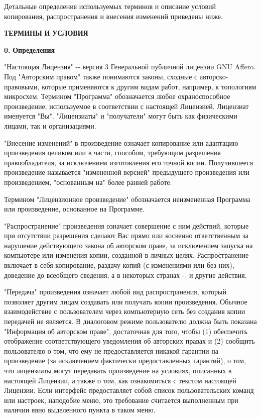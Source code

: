 Детальные определения используемых терминов и описание условий копирования, распространения и внесения изменений приведены ниже.

{\bfseries{ТЕРМИНЫ}} {\bfseries{И}} {\bfseries{УСЛОВИЯ}}

{\bfseries{0.}} {\bfseries{Определения}}

"{}Настоящая Лицензия"{} -\/-\/ версия 3 Генеральной публичной лицензии GNU Affero. Под "{}Авторским правом"{} также понимаются законы, сходные с авторско-\/правовыми, которые применяются к другим видам работ, например, к топологиям микросхем. Термином "{}Программа"{} обозначается любое охраноспособное произведение, используемое в соответствии с настоящей Лицензией. Лицензиат именуется "{}Вы"{}. "{}Лицензиаты"{} и "{}получатели"{} могут быть как физическими лицами, так и организациями.

"{}Внесение изменений"{} в произведение означает копирование или адаптацию произведения целиком или в части, способом, требующим разрешения правообладателя, за исключением изготовления его точной копии. Получившееся произведение называется "{}измененной версией"{} предыдущего произведения или произведением, "{}основанным на"{} более ранней работе.

Термином "{}Лицензионное произведение"{} обозначается неизмененная Программа или произведение, основанное на Программе.

"{}Распространение"{} произведения означает совершение с ним действий, которые при отсутствии разрешения сделают Вас прямо или косвенно ответственным за нарушение действующего закона об авторском праве, за исключением запуска на компьютере или изменения копии, созданной в личных целях. Распространение включает в себя копирование, раздачу копий (с изменениями или без них), доведение до всеобщего сведения, а в некоторых странах -\/-\/ и другие действия.

"{}Передача"{} произведения означает любой вид распространения, который позволяет другим лицам создавать или получать копии произведения. Обычное взаимодействие с пользователем через компьютерную сеть без создания копии передачей не является. В диалоговом режиме пользователю должна быть показана "{}Информация об авторском праве"{}, достаточная для того, чтобы (1) обеспечить отображение соответствующего уведомления об авторских правах и (2) сообщить пользователю о том, что ему не предоставляется никакой гарантии на произведение (за исключением фактически предоставленных гарантий), о том, что лицензиаты могут передавать произведение на условиях, описанных в настоящей Лицензии, а также о том, как ознакомиться с текстом настоящей Лицензии. Если интерфейс предоставляет собой список пользовательских команд или настроек, наподобие меню, это требование считается выполненным при наличии явно выделенного пункта в таком меню.

